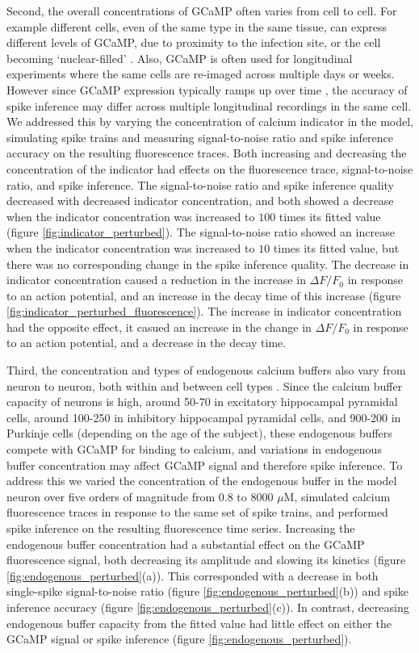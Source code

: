 Second, the overall concentrations of GCaMP often varies from cell to cell. For example different cells, even of the same type in the same tissue, can express different levels of GCaMP, due to proximity to the infection site, or the cell becoming `nuclear-filled' \parencite{tian, chen}. Also, GCaMP is often used for longitudinal experiments where the same cells are re-imaged across multiple days or weeks. However since GCaMP expression typically ramps up over time  \parencite{chen}, the accuracy of spike inference may differ across multiple longitudinal recordings in the same cell. We addressed this by varying the concentration of calcium indicator in the model, simulating spike trains and measuring signal-to-noise ratio and spike inference accuracy on the resulting fluorescence traces. Both increasing and decreasing the concentration of the indicator had effects on the fluorescence trace, signal-to-noise ratio, and spike inference. The signal-to-noise ratio and spike inference quality decreased with decreased indicator concentration, and both showed a decrease when the indicator concentration was increased to $100$ times its fitted value (figure \ref{fig:indicator_perturbed}). The signal-to-noise ratio showed an increase when the indicator concentration was increased to $10$ times its fitted value, but there was no corresponding change in the spike inference quality. The decrease in indicator concentration caused a reduction in the increase in $\Delta F/F_0$ in response to an action potential, and an increase in the decay time of this increase (figure \ref{fig:indicator_perturbed_fluorescence}). The increase in indicator concentration had the opposite effect, it casued an increase in the change in $\Delta F/F_0$ in response to an action potential, and a decrease in the decay time.

Third, the concentration and types of endogenous calcium buffers also vary from neuron to neuron, both within and between cell types \parencite{bartol, maravall, neher}. Since the calcium buffer capacity of neurons is high, around 50-70 \parencite{lee} in excitatory hippocampal pyramidal cells, around 100-250 \parencite{lee} in inhibitory hippocampal pyramidal cells, and 900-200 in Purkinje cells (depending on the age of the subject), these endogenous buffers compete with GCaMP for binding to calcium, and variations in endogenous buffer concentration may affect GCaMP signal and therefore spike inference. To address this we varied the concentration of the endogenous buffer in the model neuron over five orders of magnitude from $0.8$ to $8000$ $\mu$M, simulated calcium fluorescence traces in response to the same set of spike trains, and performed spike inference on the resulting fluorescence time series. Increasing the endogenous buffer concentration had a substantial effect on the GCaMP fluorescence signal, both decreasing its amplitude and slowing its kinetics (figure \ref{fig:endogenous_perturbed}(a)). This corresponded with a decrease in both single-spike signal-to-noise ratio (figure \ref{fig:endogenous_perturbed}(b)) and spike inference accuracy (figure \ref{fig:endogenous_perturbed}(c)). In contrast, decreasing endogenous buffer capacity from the fitted value had little effect on either the GCaMP signal or spike inference (figure \ref{fig:endogenous_perturbed}).

